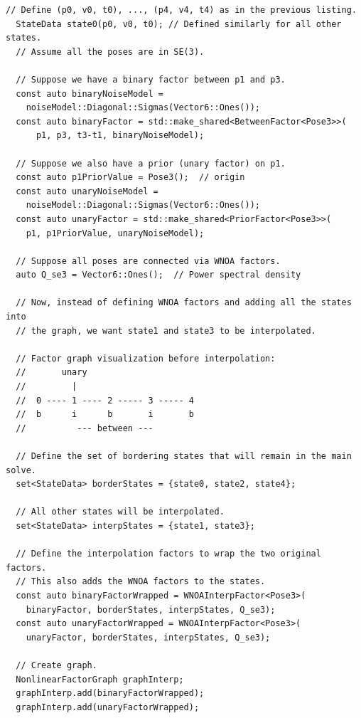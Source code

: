 \begin{lstlisting}[style=C++Style, label={lst:interp}, caption={Constructing an interpolated factor graph.}]
  // Define (p0, v0, t0), ..., (p4, v4, t4) as in the previous listing.
  StateData state0(p0, v0, t0); // Defined similarly for all other states.
  // Assume all the poses are in SE(3).
  
  // Suppose we have a binary factor between p1 and p3.
  const auto binaryNoiseModel = 
    noiseModel::Diagonal::Sigmas(Vector6::Ones());
  const auto binaryFactor = std::make_shared<BetweenFactor<Pose3>>(
      p1, p3, t3-t1, binaryNoiseModel);
  
  // Suppose we also have a prior (unary factor) on p1.
  const auto p1PriorValue = Pose3();  // origin
  const auto unaryNoiseModel = 
    noiseModel::Diagonal::Sigmas(Vector6::Ones());
  const auto unaryFactor = std::make_shared<PriorFactor<Pose3>>(
    p1, p1PriorValue, unaryNoiseModel);
  
  // Suppose all poses are connected via WNOA factors.
  auto Q_se3 = Vector6::Ones();  // Power spectral density
  
  // Now, instead of defining WNOA factors and adding all the states into
  // the graph, we want state1 and state3 to be interpolated.
  
  // Factor graph visualization before interpolation:
  //       unary
  //         |
  //  0 ---- 1 ---- 2 ----- 3 ----- 4
  //  b      i      b       i       b
  //          --- between ---
  
  // Define the set of bordering states that will remain in the main solve.
  set<StateData> borderStates = {state0, state2, state4};
  
  // All other states will be interpolated.
  set<StateData> interpStates = {state1, state3};
  
  // Define the interpolation factors to wrap the two original factors.
  // This also adds the WNOA factors to the states.
  const auto binaryFactorWrapped = WNOAInterpFactor<Pose3>(
    binaryFactor, borderStates, interpStates, Q_se3);
  const auto unaryFactorWrapped = WNOAInterpFactor<Pose3>(
    unaryFactor, borderStates, interpStates, Q_se3);

  // Create graph.
  NonlinearFactorGraph graphInterp;
  graphInterp.add(binaryFactorWrapped);
  graphInterp.add(unaryFactorWrapped);
  

\end{lstlisting}

